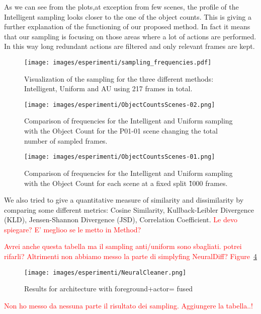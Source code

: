 As we can see from the plots,at exception from few scenes, the profile of the Intelligent sampling looks closer
to the one of the object counts. This is giving a further explanation of the functioning of our proposed method.
In fact it means that our sampling is focusing on those areas where a lot of actions are performed. In this way
long redundant actions are filtered and only relevant frames are kept. 

\begin{figure}
    \centering
    \texttt{[image: images/esperimenti/sampling\_frequencies.pdf]} 
    \caption{Visualization of the sampling for the three different methods: Intelligent, Uniform and AU using 217 frames in total.}\label{fig:samplFreq}
\end{figure}

\begin{figure}
    \centering
    \texttt{[image: images/esperimenti/ObjectCountsScenes-02.png]} 
    \caption{Comparison of frequencies for the Intelligent and Uniform sampling with the Object Count for the P01-01 scene changing the total
    number of sampled frames.}\label{fig:samplFreq}
\end{figure}

\begin{figure}
    \centering
    \texttt{[image: images/esperimenti/ObjectCountsScenes-01.png]} 
    \caption{Comparison of frequencies for the Intelligent and Uniform sampling with the Object Count for each scene at a fixed split \~1000 frames.}\label{fig:samplFreq}
\end{figure}

We also tried to give a quantitative measure of similarity and dissimilarity by comparing some different metrics: Cosine Similarity, Kullback-Leibler Divergence (KLD),
Jensen-Shannon Divergence (JSD), Correlation Coefficient. \textcolor{red}{Le devo spiegare? E' meglioo se le metto in Method?}


\textcolor{red}{Avrei anche questa tabella ma il sampling anti/uniform sono sbagliati.
potrei rifarli? Altrimenti non abbiamo messo la parte di simplyfing NeuralDiff? Figure~\ref{fig:NeuralCleaner}}
\begin{figure}
    \centering
    \texttt{[image: images/esperimenti/NeuralCleaner.png]} 
    \caption{Results for architecture with foreground+actor= fused}\label{fig:NeuralCleaner}
\end{figure}

\textcolor{red}{Non ho messo da nessuna parte il risultato dei sampling. Aggiungere la tabella..!}